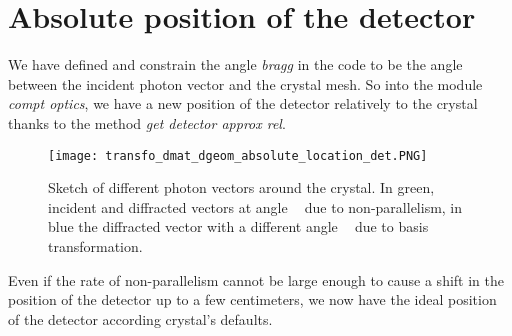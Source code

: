 \documentclass[a4paper,11pt,twoside,openright]{article}
\DeclareMathOperator{\bragg}{\theta_{bragg}}
\begin{document}
\section{Absolute position of the detector}

We have defined and constrain the angle \textit{bragg} in the code to be the angle between the incident photon vector and the crystal mesh. So into the module \textit{compt optics}, we have a new position of the detector relatively to the crystal thanks to the method \textit{get detector approx rel}. 
\begin{figure}[h]
    \centering
    \texttt{[image: transfo\_dmat\_dgeom\_absolute\_location\_det.PNG]}
    \caption{Sketch of different photon vectors around the crystal. In green, incident and diffracted vectors at angle $\bragg$ due to non-parallelism, in blue the diffracted vector with a different angle $\bragg$ due to basis transformation.}
    \label{fig:new_vector}
\end{figure}

Even if the rate of non-parallelism cannot be large enough to cause a shift in the position of the detector up to a few centimeters, we now have the ideal position of the detector according crystal's defaults.
\end{document}
